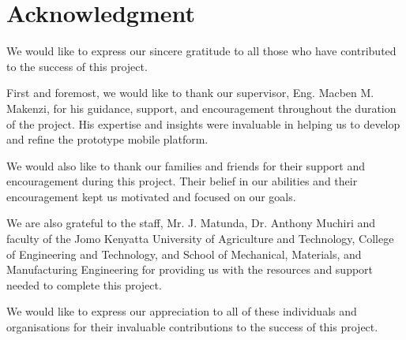 \section*{Acknowledgment}
We would like to express our sincere gratitude to all those who have contributed to the success of this project.

First and foremost, we would like to thank our supervisor, Eng. Macben M. Makenzi, for his guidance, support, and encouragement throughout the duration of the project. His expertise and insights were invaluable in helping us to develop and refine the prototype mobile platform.

We would also like to thank our families and friends for their support and encouragement during this project. Their belief in our abilities and their encouragement kept us motivated and focused on our goals.

We are also grateful to the staff, Mr. J. Matunda, Dr. Anthony Muchiri and faculty of the Jomo Kenyatta University of Agriculture and Technology, College of Engineering and Technology, and School of Mechanical, Materials, and Manufacturing Engineering for providing us with the resources and support needed to complete this project.

We would like to express our appreciation to all of these individuals and organisations for their invaluable contributions to the success of this project.



